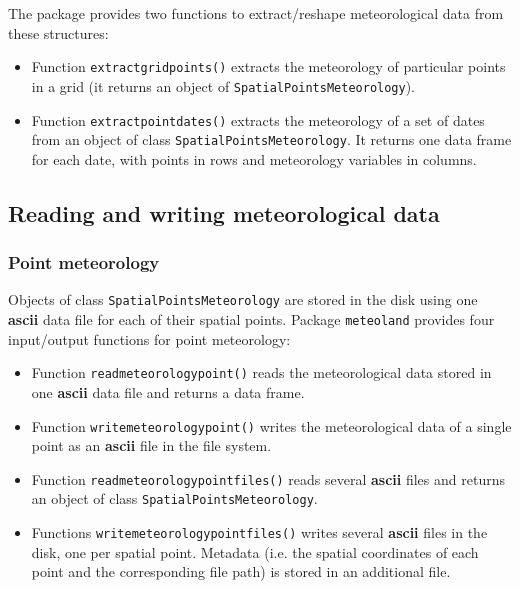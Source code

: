 \documentclass[11pt,a4paper]{article}
\begin{document}
The package provides two functions to extract/reshape meteorological data from these structures:
\begin{itemize}
\item{Function \texttt{extractgridpoints()} extracts the meteorology of particular points in a grid (it returns an object of \texttt{SpatialPointsMeteorology}).}
\item{Function \texttt{extractpointdates()} extracts the meteorology of a set of dates from an object of class \texttt{SpatialPointsMeteorology}. It returns one data frame for each date, with points in rows and meteorology variables in columns.}
\end{itemize}

\subsection{Reading and writing meteorological data}
\subsubsection{Point meteorology}
Objects of class \texttt{SpatialPointsMeteorology} are stored in the disk using one \textbf{ascii} data file for each of their spatial points. Package \texttt{meteoland} provides four input/output functions for point meteorology:
\begin{itemize}
\item{Function \texttt{readmeteorologypoint()} reads the meteorological data stored in one \textbf{ascii} data file and returns a data frame.}
\item{Function \texttt{writemeteorologypoint()} writes the meteorological data of a single point as an \textbf{ascii} file in the file system.}
\item{Function \texttt{readmeteorologypointfiles()} reads several \textbf{ascii} files and returns an object of class \texttt{SpatialPointsMeteorology}.}
\item{Functions \texttt{writemeteorologypointfiles()} writes several \textbf{ascii} files in the disk, one per spatial point. Metadata (i.e. the spatial coordinates of each point and the corresponding file path) is stored in an additional file.}
\end{itemize}
\end{document}
